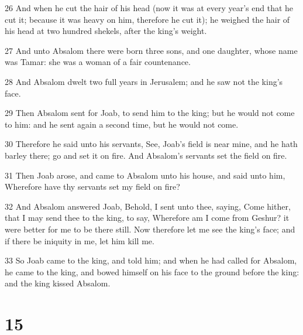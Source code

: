 \par 26 And when he cut the hair of his head (now it was at every year's end that he cut it; because it was heavy on him, therefore he cut it); he weighed the hair of his head at two hundred shekels, after the king's weight.
\par 27 And unto Absalom there were born three sons, and one daughter, whose name was Tamar: she was a woman of a fair countenance.
\par 28 And Absalom dwelt two full years in Jerusalem; and he saw not the king's face.
\par 29 Then Absalom sent for Joab, to send him to the king; but he would not come to him: and he sent again a second time, but he would not come.
\par 30 Therefore he said unto his servants, See, Joab's field is near mine, and he hath barley there; go and set it on fire. And Absalom's servants set the field on fire.
\par 31 Then Joab arose, and came to Absalom unto his house, and said unto him, Wherefore have thy servants set my field on fire?
\par 32 And Absalom answered Joab, Behold, I sent unto thee, saying, Come hither, that I may send thee to the king, to say, Wherefore am I come from Geshur? it were better for me to be there still. Now therefore let me see the king's face; and if there be iniquity in me, let him kill me.
\par 33 So Joab came to the king, and told him; and when he had called for Absalom, he came to the king, and bowed himself on his face to the ground before the king: and the king kissed Absalom.

\chapter{15}

